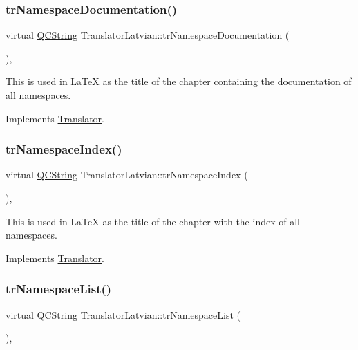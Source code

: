 \subsubsection{\texorpdfstring{trNamespaceDocumentation()}{trNamespaceDocumentation()}}
{\footnotesize\ttfamily virtual \mbox{\hyperlink{class_q_c_string}{Q\+C\+String}} Translator\+Latvian\+::tr\+Namespace\+Documentation (\begin{DoxyParamCaption}{ }\end{DoxyParamCaption})\hspace{0.3cm}{\ttfamily [inline]}, {\ttfamily [virtual]}}

This is used in La\+TeX as the title of the chapter containing the documentation of all namespaces. 

Implements \mbox{\hyperlink{class_translator}{Translator}}.

\mbox{\label{class_translator_latvian_aa29f1b80c956ddc119c2ad088cab5d47}} 
\subsubsection{\texorpdfstring{trNamespaceIndex()}{trNamespaceIndex()}}
{\footnotesize\ttfamily virtual \mbox{\hyperlink{class_q_c_string}{Q\+C\+String}} Translator\+Latvian\+::tr\+Namespace\+Index (\begin{DoxyParamCaption}{ }\end{DoxyParamCaption})\hspace{0.3cm}{\ttfamily [inline]}, {\ttfamily [virtual]}}

This is used in La\+TeX as the title of the chapter with the index of all namespaces. 

Implements \mbox{\hyperlink{class_translator}{Translator}}.

\mbox{\label{class_translator_latvian_ae09945c3bc7de35001d4dd654baeab14}} 
\subsubsection{\texorpdfstring{trNamespaceList()}{trNamespaceList()}}
{\footnotesize\ttfamily virtual \mbox{\hyperlink{class_q_c_string}{Q\+C\+String}} Translator\+Latvian\+::tr\+Namespace\+List (\begin{DoxyParamCaption}{ }\end{DoxyParamCaption})\hspace{0.3cm}{\ttfamily [inline]}, {\ttfamily [virtual]}}

